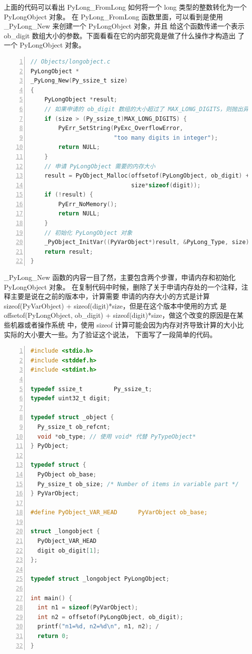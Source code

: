 上面的代码可以看出 PyLong\_FromLong 如何将一个 long 类型的整数转化为一个 PyLongObject 对象。
在 PyLong\_FromLong 函数里面，可以看到是使用 \_PyLong\_New 来创建一个 PyLongObject 对象，并且
给这个函数传递一个表示 ob\_digit 数组大小的参数。下面看看在它的内部究竟是做了什么操作才构造出
了一个 PyLongObject 对象。

\begin{lstlisting}[language=C, numbers=left, numbersep=1em, numberstyle=\footnotesize , breaklines=true]
// Objects/longobject.c
PyLongObject *
_PyLong_New(Py_ssize_t size)
{
    PyLongObject *result;
    // 如果申请的 ob_digit 数组的大小超过了 MAX_LONG_DIGITS，则抛出异常 
    if (size > (Py_ssize_t)MAX_LONG_DIGITS) {
        PyErr_SetString(PyExc_OverflowError,
                        "too many digits in integer");
        return NULL;
    }
    // 申请 PyLongObject 需要的内存大小
    result = PyObject_Malloc(offsetof(PyLongObject, ob_digit) +
                             size*sizeof(digit));
    if (!result) {
        PyErr_NoMemory();
        return NULL;
    }
    // 初始化 PyLongObject 对象
    _PyObject_InitVar((PyVarObject*)result, &PyLong_Type, size);
    return result;
}
\end{lstlisting}

\_PyLong\_New 函数的内容一目了然，主要包含两个步骤，申请内存和初始化 PyLongObject 对象。
在复制代码中时候，删除了关于申请内存处的一个注释，注释主要是说在之前的版本中，计算需要
申请的内存大小的方式是计算 sizeof(PyVarObject) + sizeof(digit)*size，但是在这个版本中使用的方式
是 offsetof(PyLongObject, ob\_digit) + sizeof(digit)*size，做这个改变的原因是在某些机器或者操作系统
中，使用 sizeof 计算可能会因为内存对齐导致计算的大小比实际的大小要大一些。为了验证这个说法，
下面写了一段简单的代码。

\begin{lstlisting}[language=C, numbers=left, numbersep=1em, numberstyle=\footnotesize , breaklines=true]
#include <stdio.h>
#include <stddef.h>
#include <stdint.h>

typedef ssize_t         Py_ssize_t;
typedef uint32_t digit;

typedef struct _object {
  Py_ssize_t ob_refcnt;
  void *ob_type; // 使用 void* 代替 PyTypeObject*
} PyObject;

typedef struct {
  PyObject ob_base;
  Py_ssize_t ob_size; /* Number of items in variable part */
} PyVarObject;

#define PyObject_VAR_HEAD      PyVarObject ob_base;

struct _longobject {
  PyObject_VAR_HEAD
  digit ob_digit[1];
};

typedef struct _longobject PyLongObject;

int main() {
  int n1 = sizeof(PyVarObject);
  int n2 = offsetof(PyLongObject, ob_digit);
  printf("n1=%d, n2=%d\n", n1, n2); /
  return 0;
}
\end{lstlisting}

